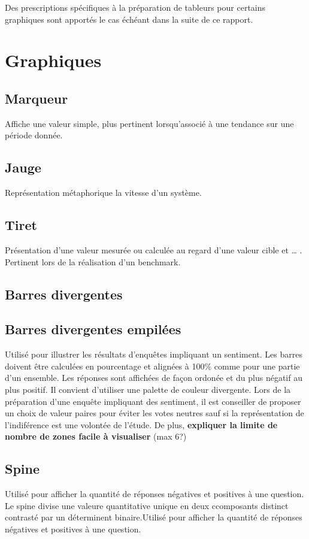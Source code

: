 \documentclass[a4paper,12pt]{article}
\begin{document}
\begin{multicols}{2}
Des prescriptions spécifiques à la préparation de tableurs pour certains graphiques sont apportés le cas échéant dans la suite de ce rapport.
\section*{Graphiques}
\label{sec:org645b55e}
\subsection*{Marqueur}
\label{sec:org3fad42b}
Affiche une valeur simple, plus pertinent lorsqu'associé à une tendance sur une période donnée.
\subsection*{Jauge}
\label{sec:org788c3cb}
Représentation métaphorique  la vitesse d'un système.
\subsection*{Tiret}
\label{sec:orgbc13e24}
Présentation d'une valeur mesurée ou calculée au regard d'une valeur cible et \ldots{} . Pertinent lors de la réalisation d'un benchmark.
\subsection*{Barres divergentes}
\label{sec:org8f92aae}

\subsection*{Barres divergentes empilées}
\label{sec:org32dbbf3}
Utilisé pour illustrer les résultats d'enquêtes impliquant un sentiment. Les barres doivent être calculées en pourcentage et alignées à 100\% comme pour une partie d'un ensemble. Les réponses sont affichées de façon ordonée et du plus négatif au plus positif. Il convient d'utiliser une palette de couleur divergente. Lors de la préparation d'une enquête impliquant des sentiment, il est conseiller de proposer un choix de valeur paires pour éviter les votes neutres sauf si la représentation de l'indiférence est une volontée de l'étude. De plus, \textbf{expliquer la limite de nombre de zones facile à visualiser} (max 6?)
\subsection*{Spine}
\label{sec:org9d1c35c}
Utilisé pour afficher la quantité de réponses négatives et positives à une question. Le spine divise une valeure quantitative unique en deux ccomposants distinct contrasté par un déterminent binaire.Utilisé pour afficher la quantité de réponses négatives et positives à une question.

\end{multicols}
\end{document}
